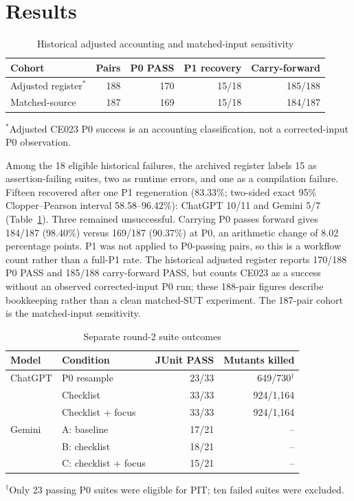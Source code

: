 \documentclass[conference]{IEEEtran}
\begin{document}
\section{Results}
\begin{table}[t]
\caption{Historical adjusted accounting and matched-input sensitivity}
\label{tab:hist}
\centering\scriptsize
\setlength{\tabcolsep}{2pt}
\begin{tabular}{@{}lrrrr@{}}
\toprule
Cohort & Pairs & P0 PASS & P1 recovery & Carry-forward \\
\midrule
Adjusted register$^*$ & 188 & 170 & 15/18 & 185/188 \\
Matched-source & 187 & 169 & 15/18 & 184/187 \\
\bottomrule
\end{tabular}
\par\raggedright\scriptsize $^*$Adjusted CE023 P0 success is an accounting classification, not a corrected-input P0 observation.
\end{table}

Among the 18 eligible historical failures, the archived register labels 15 as assertion-failing suites, two as runtime errors, and one as a compilation failure. Fifteen recovered after one P1 regeneration (83.33\%; two-sided exact 95\% Clopper--Pearson interval 58.58--96.42\%): ChatGPT 10/11 and Gemini 5/7 (Table~\ref{tab:hist}). Three remained unsuccessful. Carrying P0 passes forward gives 184/187 (98.40\%) versus 169/187 (90.37\%) at P0, an arithmetic change of 8.02 percentage points. P1 was not applied to P0-passing pairs, so this is a workflow count rather than a full-P1 rate. The historical adjusted register reports 170/188 P0 PASS and 185/188 carry-forward PASS, but counts CE023 as a success without an observed corrected-input P0 run; these 188-pair figures describe bookkeeping rather than a clean matched-SUT experiment. The 187-pair cohort is the matched-input sensitivity.
\begin{table}[t]
\caption{Separate round-2 suite outcomes}
\label{tab:r2}
\centering\scriptsize
\setlength{\tabcolsep}{3pt}
\begin{tabular}{@{}llrr@{}}
\toprule
Model & Condition & JUnit PASS & Mutants killed \\
\midrule
ChatGPT & P0 resample & 23/33 & 649/730$^\dagger$ \\
 & Checklist & 33/33 & 924/1,164 \\
 & Checklist + focus & 33/33 & 924/1,164 \\
\midrule
Gemini & A: baseline & 17/21 & -- \\
 & B: checklist & 18/21 & -- \\
 & C: checklist + focus & 15/21 & -- \\
\bottomrule
\end{tabular}
\par\raggedright\scriptsize $^\dagger$Only 23 passing P0 suites were eligible for PIT; ten failed suites were excluded.
\end{table}
\end{document}

